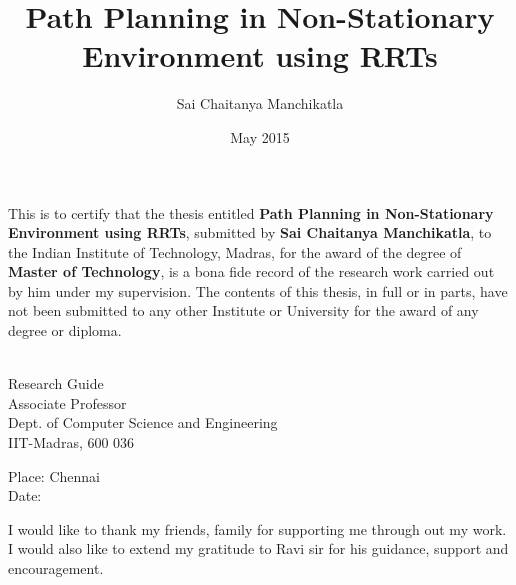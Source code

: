 \documentclass[MTech]{iitmdiss}
\def\thesistitle{Path Planning in Non-Stationary Environment using RRTs}
\def\thesisauthor{Sai Chaitanya Manchikatla}
\begin{document}


\title{\thesistitle}

\author{\thesisauthor}

\date{May 2015}

\begin{singlespace}
\maketitle 
\end{singlespace} 

\certificate

\vspace*{0.5in}

\noindent This is to certify that the thesis entitled {\bf {\thesistitle}}, 
submitted by {\bf {\thesisauthor}}, to the Indian Institute of Technology, 
Madras, for the award of the degree of {\bf Master of Technology}, 
is a bona fide record of the research work carried out by him under my
supervision. The contents of this thesis, in full or in parts, have not been
submitted to any other Institute or University for the award of any degree or
diploma.

\vspace*{1.4in}
\hspace*{-0.25in}
\begin{singlespace}
 \\
\noindent Research Guide \\ 
\noindent Associate Professor \\
\noindent Dept. of Computer Science and Engineering\\
\noindent IIT-Madras, 600 036 \\
\end{singlespace}
\vspace*{0.20in}
\noindent Place: Chennai\\ 
Date:

\acknowledgements
I would like to thank my friends, family for supporting me through out my work. I would also like to extend my gratitude to Ravi sir for his guidance, support and encouragement. 
\end{document}
